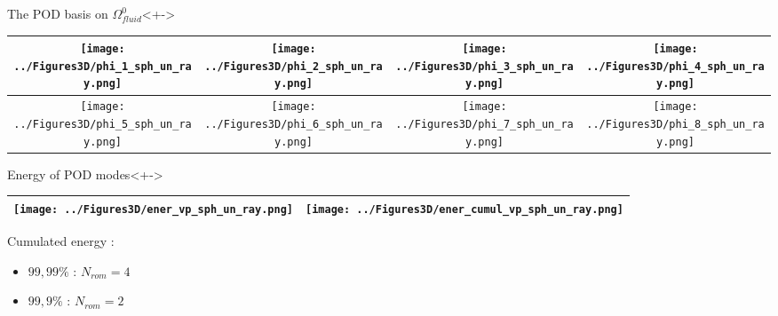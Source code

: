 \begin{frame}%
%
\begin{block}{The POD basis on $\Omega_{fluid}^0$}<+->
%
\begin{center}
\begin{tabular}{|c|c|c|c|}
\hline
\texttt{[image: ../Figures3D/phi\_1\_sph\_un\_ray.png]}%
&%
\texttt{[image: ../Figures3D/phi\_2\_sph\_un\_ray.png]}%
&%
\texttt{[image: ../Figures3D/phi\_3\_sph\_un\_ray.png]}%
&%
\texttt{[image: ../Figures3D/phi\_4\_sph\_un\_ray.png]}%
\\
\hline
\texttt{[image: ../Figures3D/phi\_5\_sph\_un\_ray.png]}%
&%
\texttt{[image: ../Figures3D/phi\_6\_sph\_un\_ray.png]}%
&%
\texttt{[image: ../Figures3D/phi\_7\_sph\_un\_ray.png]}%
&%
\texttt{[image: ../Figures3D/phi\_8\_sph\_un\_ray.png]}%
\\
\hline
\end{tabular}
\end{center}
%
\end{block}
%
\begin{block}{Energy of POD modes}<+->
%
\begin{center}
\begin{tabular}{|c|c|}
\hline
\texttt{[image: ../Figures3D/ener\_vp\_sph\_un\_ray.png]}
&%
\texttt{[image: ../Figures3D/ener\_cumul\_vp\_sph\_un\_ray.png]}
\\ \hline
\end{tabular}
\end{center}

\begin{multicols}{2}
Cumulated energy :

\columnbreak
\begin{itemize}
\item<+-> $99,99\%$ : $N_{rom}=4$
\item<+-> $99,9\%$ : $N_{rom}=2$
\end{itemize}
%
\end{multicols}
%
\end{block}

\end{frame}

